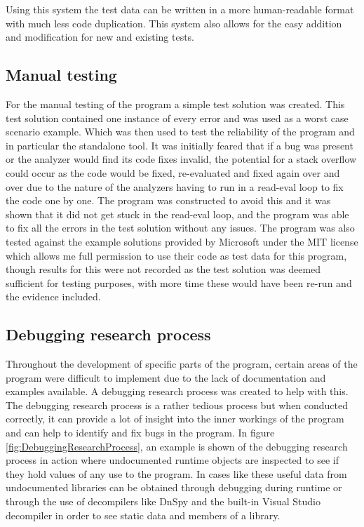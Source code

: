 Using this system the test data can be written in a more human-readable format with much less code duplication. This system also allows for the easy addition and modification for new and existing tests.

\subsection*{Manual testing}
\label{sec:StandaloneToolTests}
For the manual testing of the program a simple test solution was created. This test solution contained one instance of every error and was used as a worst case scenario example. Which was then used to test the reliability of the program and in particular the standalone tool. It was initially feared that if a bug was present or the analyzer would find its code fixes invalid, the potential for a stack overflow could occur as the code would be fixed, re-evaluated and fixed again over and over due to the nature of the analyzers having to run in a read-eval loop to fix the code one by one. The program was constructed to avoid this and it was shown that it did not get stuck in the read-eval loop, and the program was able to fix all the errors in the test solution without any issues. The program was also tested against the example solutions provided by Microsoft under the MIT license which allows me full permission to use their code as test data for this program, though results for this were not recorded as the test solution was deemed sufficient for testing purposes, with more time these would have been re-run and the evidence included.

\subsection*{Debugging research process}
\label{sec:DebuggingResearchProcess}
Throughout the development of specific parts of the program, certain areas of the program were difficult to implement due to the lack of documentation and examples available. A debugging research process was created to help with this. The debugging research process is a rather tedious process but when conducted correctly, it can provide a lot of insight into the inner workings of the program and can help to identify and fix bugs in the program. In figure \ref{fig:DebuggingResearchProcess}, an example is shown of the debugging research process in action where undocumented runtime objects are inspected to see if they hold values of any use to the program. In cases like these useful data from undocumented libraries can be obtained through debugging during runtime or through the use of decompilers like DnSpy and the built-in Visual Studio decompiler in order to see static data and members of a library.

